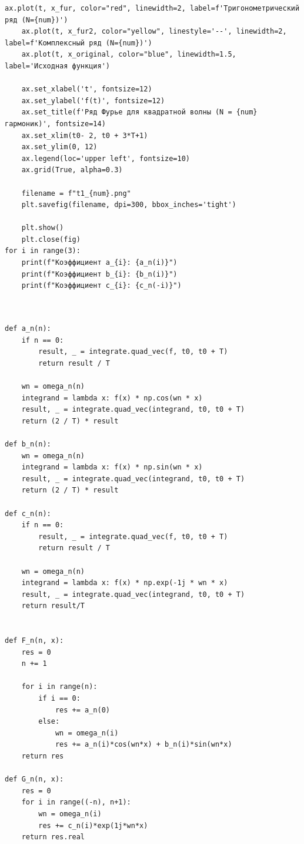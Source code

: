 \documentclass[a4paper, 12pt]{article}
\begin{document}
\begin{lstlisting}[caption = {Код для построение графика функции(конкретно квадратной волны)}]
    ax.plot(t, x_fur, color="red", linewidth=2, label=f'Тригонометрический ряд (N={num})')
    ax.plot(t, x_fur2, color="yellow", linestyle='--', linewidth=2, label=f'Комплексный ряд (N={num})')
    ax.plot(t, x_original, color="blue", linewidth=1.5, label='Исходная функция')
    
    ax.set_xlabel('t', fontsize=12)
    ax.set_ylabel('f(t)', fontsize=12)
    ax.set_title(f'Ряд Фурье для квадратной волны (N = {num} гармоник)', fontsize=14)
    ax.set_xlim(t0- 2, t0 + 3*T+1)
    ax.set_ylim(0, 12)
    ax.legend(loc='upper left', fontsize=10)
    ax.grid(True, alpha=0.3)
    
    filename = f"t1_{num}.png"
    plt.savefig(filename, dpi=300, bbox_inches='tight')
    
    plt.show()
    plt.close(fig)
for i in range(3):
    print(f"Коэффициент a_{i}: {a_n(i)}")
    print(f"Коэффициент b_{i}: {b_n(i)}")
    print(f"Коэффициент c_{i}: {c_n(-i)}")

\end{lstlisting}

\begin{lstlisting}[caption={Функции вычисления коэффициентов и частичных сумм для произвольной функции}]
    

def a_n(n):
    if n == 0:
        result, _ = integrate.quad_vec(f, t0, t0 + T)
        return result / T
    
    wn = omega_n(n)
    integrand = lambda x: f(x) * np.cos(wn * x)
    result, _ = integrate.quad_vec(integrand, t0, t0 + T)
    return (2 / T) * result

def b_n(n):
    wn = omega_n(n)
    integrand = lambda x: f(x) * np.sin(wn * x)
    result, _ = integrate.quad_vec(integrand, t0, t0 + T)
    return (2 / T) * result

def c_n(n):
    if n == 0:
        result, _ = integrate.quad_vec(f, t0, t0 + T)
        return result / T
    
    wn = omega_n(n)
    integrand = lambda x: f(x) * np.exp(-1j * wn * x)
    result, _ = integrate.quad_vec(integrand, t0, t0 + T)
    return result/T


def F_n(n, x):
    res = 0
    n += 1

    for i in range(n):
        if i == 0:
            res += a_n(0)
        else:
            wn = omega_n(i)
            res += a_n(i)*cos(wn*x) + b_n(i)*sin(wn*x)
    return res

def G_n(n, x):
    res = 0
    for i in range((-n), n+1):
        wn = omega_n(i)
        res += c_n(i)*exp(1j*wn*x)
    return res.real

\end{lstlisting}
\end{document}
